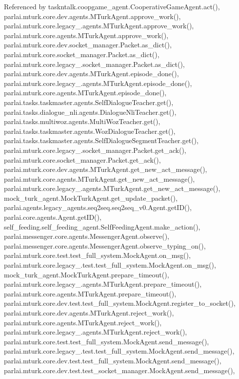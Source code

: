 Referenced by taskntalk.\+coopgame\+\_\+agent.\+Cooperative\+Game\+Agent.\+act(), parlai.\+mturk.\+core.\+dev.\+agents.\+M\+Turk\+Agent.\+approve\+\_\+work(), parlai.\+mturk.\+core.\+legacy\+\_.\+agents.\+M\+Turk\+Agent.\+approve\+\_\+work(), parlai.\+mturk.\+core.\+agents.\+M\+Turk\+Agent.\+approve\+\_\+work(), parlai.\+mturk.\+core.\+dev.\+socket\+\_\+manager.\+Packet.\+as\+\_\+dict(), parlai.\+mturk.\+core.\+socket\+\_\+manager.\+Packet.\+as\+\_\+dict(), parlai.\+mturk.\+core.\+legacy\+\_.\+socket\+\_\+manager.\+Packet.\+as\+\_\+dict(), parlai.\+mturk.\+core.\+dev.\+agents.\+M\+Turk\+Agent.\+episode\+\_\+done(), parlai.\+mturk.\+core.\+legacy\+\_.\+agents.\+M\+Turk\+Agent.\+episode\+\_\+done(), parlai.\+mturk.\+core.\+agents.\+M\+Turk\+Agent.\+episode\+\_\+done(), parlai.\+tasks.\+taskmaster.\+agents.\+Self\+Dialogue\+Teacher.\+get(), parlai.\+tasks.\+dialogue\+\_\+nli.\+agents.\+Dialogue\+Nli\+Teacher.\+get(), parlai.\+tasks.\+multiwoz.\+agents.\+Multi\+Woz\+Teacher.\+get(), parlai.\+tasks.\+taskmaster.\+agents.\+Woz\+Dialogue\+Teacher.\+get(), parlai.\+tasks.\+taskmaster.\+agents.\+Self\+Dialogue\+Segment\+Teacher.\+get(), parlai.\+mturk.\+core.\+legacy\+\_.\+socket\+\_\+manager.\+Packet.\+get\+\_\+ack(), parlai.\+mturk.\+core.\+socket\+\_\+manager.\+Packet.\+get\+\_\+ack(), parlai.\+mturk.\+core.\+dev.\+agents.\+M\+Turk\+Agent.\+get\+\_\+new\+\_\+act\+\_\+message(), parlai.\+mturk.\+core.\+agents.\+M\+Turk\+Agent.\+get\+\_\+new\+\_\+act\+\_\+message(), parlai.\+mturk.\+core.\+legacy\+\_.\+agents.\+M\+Turk\+Agent.\+get\+\_\+new\+\_\+act\+\_\+message(), mock\+\_\+turk\+\_\+agent.\+Mock\+Turk\+Agent.\+get\+\_\+update\+\_\+packet(), parlai.\+agents.\+legacy\+\_\+agents.\+seq2seq.\+seq2seq\+\_\+v0.\+Agent.\+get\+I\+D(), parlai.\+core.\+agents.\+Agent.\+get\+I\+D(), self\+\_\+feeding.\+self\+\_\+feeding\+\_\+agent.\+Self\+Feeding\+Agent.\+make\+\_\+action(), parlai.\+messenger.\+core.\+agents.\+Messenger\+Agent.\+observe(), parlai.\+messenger.\+core.\+agents.\+Messenger\+Agent.\+observe\+\_\+typing\+\_\+on(), parlai.\+mturk.\+core.\+test.\+test\+\_\+full\+\_\+system.\+Mock\+Agent.\+on\+\_\+msg(), parlai.\+mturk.\+core.\+legacy\+\_.\+test.\+test\+\_\+full\+\_\+system.\+Mock\+Agent.\+on\+\_\+msg(), mock\+\_\+turk\+\_\+agent.\+Mock\+Turk\+Agent.\+prepare\+\_\+timeout(), parlai.\+mturk.\+core.\+legacy\+\_.\+agents.\+M\+Turk\+Agent.\+prepare\+\_\+timeout(), parlai.\+mturk.\+core.\+agents.\+M\+Turk\+Agent.\+prepare\+\_\+timeout(), parlai.\+mturk.\+core.\+dev.\+test.\+test\+\_\+full\+\_\+system.\+Mock\+Agent.\+register\+\_\+to\+\_\+socket(), parlai.\+mturk.\+core.\+dev.\+agents.\+M\+Turk\+Agent.\+reject\+\_\+work(), parlai.\+mturk.\+core.\+agents.\+M\+Turk\+Agent.\+reject\+\_\+work(), parlai.\+mturk.\+core.\+legacy\+\_.\+agents.\+M\+Turk\+Agent.\+reject\+\_\+work(), parlai.\+mturk.\+core.\+test.\+test\+\_\+full\+\_\+system.\+Mock\+Agent.\+send\+\_\+message(), parlai.\+mturk.\+core.\+legacy\+\_.\+test.\+test\+\_\+full\+\_\+system.\+Mock\+Agent.\+send\+\_\+message(), parlai.\+mturk.\+core.\+dev.\+test.\+test\+\_\+full\+\_\+system.\+Mock\+Agent.\+send\+\_\+message(), parlai.\+mturk.\+core.\+dev.\+test.\+test\+\_\+socket\+\_\+manager.\+Mock\+Agent.\+send\+\_\+message(), 